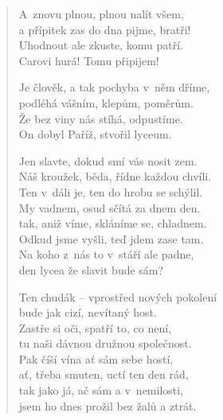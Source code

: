 \begin{verse}
\medskip

A~znovu plnou, plnou nalít všem,\\
a přípitek zas do dna pijme, bratři!\\
Uhodnout ale zkuste, komu patří.\\
Carovi hurá! Tomu připijem!

\medskip

Je člověk, a tak pochyba v~něm dříme,\\
podléhá vášním, klepům, poměrům.\\
Že bez viny nás stíhá, odpustíme.\\
On dobyl Paříž, stvořil lyceum.

\medskip

Jen slavte, dokud smí vás nosit zem.\\
Náš kroužek, běda, řídne každou chvíli.\\
Ten v~dáli je, ten do hrobu se schýlil.\\
My vadnem, osud sčítá za dnem den.\\
tak, aniž víme, skláníme se, chladnem.\\
Odkud jsme vyšli, teď jdem zase tam.\\
Na koho z~nás to v~stáří ale padne,\\
den lycea že slavit bude sám?

\medskip

Ten chudák -- vprostřed nových pokolení\\
bude jak cizí, nevítaný host.\\
Zastře si oči, spatří to, co není,\\
tu naši dávnou družnou společnost.\\
Pak číší vína ať sám sebe hostí,\\
ať, třeba smuten, uctí ten den rád,\\
tak jako já, ač sám a v~nemilosti,\\
jsem ho dnes prožil bez žalů a ztrát.

\end{verse}